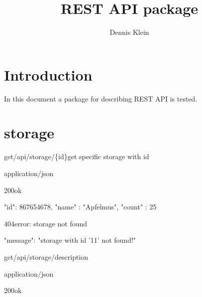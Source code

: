 \documentclass[12pt,a4paper]{article}
\title{REST API package}
\author{Dennis Klein}
\date{ }
\begin{document}
\maketitle

\section{Introduction}
In this document a package for describing REST API is tested. 

\pagebreak

\section{storage}

\begin{apiRoute}{get}{/api/storage/\{id\}}{get specific storage with id}
	
	\begin{routeParameter}
	\end{routeParameter}
	\begin{routeResponse}{application/json}
		\begin{routeResponseItem}{200}{ok}
			\begin{routeResponseItemBody}
{     
	"id": 867654678,
	"name" : "Apfelmus",
	"count" : 25
}
			\end{routeResponseItemBody}
		\end{routeResponseItem}
		\begin{routeResponseItem}{404}{error: storage not found}
			\begin{routeResponseItemBody}
{
	"message": "storage with id '11' not found!"
}
			\end{routeResponseItemBody}
		\end{routeResponseItem}
	\end{routeResponse}
	
\end{apiRoute}



\begin{apiRoute}{get}{/api/storage/}{description}
	\begin{routeParameter}
		\noRouteParamter{no parameter}
	\end{routeParameter}
	\begin{routeResponse}{application/json}
		\begin{routeResponseItem}{200}{ok}
			\begin{routeResponseItemBody}
			\end{routeResponseItemBody}
		\end{routeResponseItem}
	\end{routeResponse}
\end{apiRoute}
\end{document}
